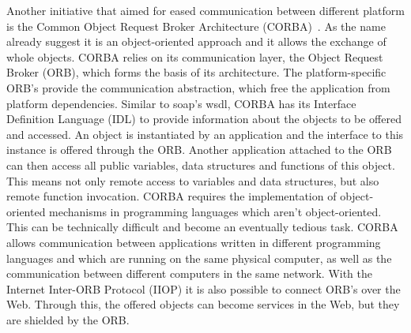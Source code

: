 Another initiative that aimed for eased communication between different platform is the Common Object Request Broker Architecture (\textrm{CORBA})~\cite{dec1991common}.
As the name already suggest it is an object-oriented approach and it allows the exchange of whole objects.
\textrm{CORBA} relies on its communication layer, the Object Request Broker (\textrm{ORB}), which forms the basis of its architecture.
The platform-specific \textrm{ORB}'s provide the communication abstraction, which free the application from platform dependencies.
Similar to \textrm{\acrshort{soap}}'s \textrm{\acrshort{wsdl}}, \textrm{CORBA} has its Interface Definition Language (\textrm{IDL}) to provide information about the objects to be offered and accessed.
An object is instantiated by an application and the interface to this instance is offered through the \textrm{ORB}.
Another application attached to the \textrm{ORB} can then access all public variables, data structures and functions of this object.
This means not only remote access to variables and data structures, but also remote function invocation.
\textrm{CORBA} requires the implementation of object-oriented mechanisms in programming languages which aren't object-oriented.
This can be technically difficult and become an eventually tedious task.
\textrm{CORBA} allows communication between applications written in different programming languages and which are running on the same physical computer, as well as the communication between different computers in the same network.
With the Internet Inter-\textrm{ORB} Protocol (\textrm{IIOP}) it is also possible to connect \textrm{ORB}'s over the Web.
Through this, the offered objects can become services in the Web, but they are shielded by the \textrm{ORB}.


